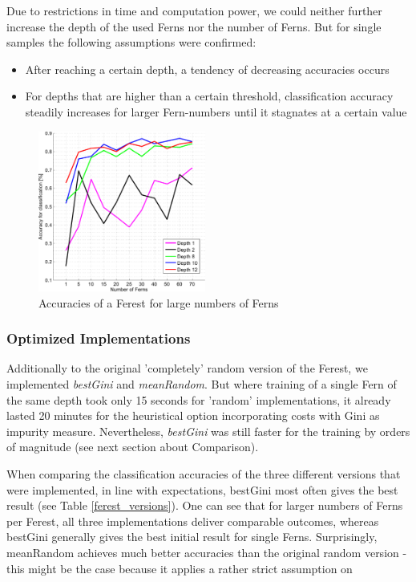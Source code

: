 \documentclass[twocolumn]{article}
\begin{document}
Due to restrictions in time and computation power, we could neither further increase the depth of the used Ferns nor the number of Ferns. But for single samples the following assumptions were confirmed: 
\begin{itemize}
\item After reaching a certain depth, a tendency of decreasing accuracies occurs
\item For depths that are higher than a certain threshold, classification accuracy steadily increases for larger Fern-numbers until it stagnates at a certain value
\end{itemize} 

\begin{figure}[h] 
\centering
\includegraphics[width=0.49\textwidth]{Diagrams/accuracies_RandFerns_12_70}
\caption{Accuracies of a Ferest for large numbers of Ferns}
\label{ferest_accuracies}
\end{figure}

\subsubsection{Optimized Implementations}

Additionally to the original 'completely' random version of the Ferest, we implemented \textit{bestGini} and \textit{meanRandom}. But where training of a single Fern of the same depth took only 15 seconds for 'random' implementations, it already lasted 20 minutes for the heuristical option incorporating costs with Gini as impurity measure. Nevertheless, \textit{bestGini} was still faster for the training by orders of magnitude (see next section about Comparison).

When comparing the classification accuracies of the three different versions that were implemented, in line with expectations, bestGini most often gives the best result (see Table \ref{ferest_versions}). One can see that for larger numbers of Ferns per Ferest, all three implementations deliver comparable outcomes, whereas bestGini generally gives the best initial result for single Ferns. Surprisingly, meanRandom achieves much better accuracies than the original random version - this might be the case because it applies a rather strict assumption on
\end{document}
